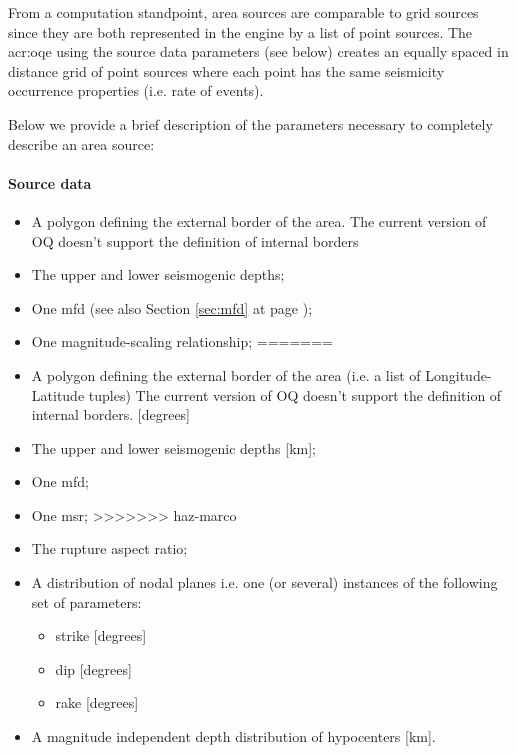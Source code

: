 From a computation standpoint, area sources are comparable to grid sources
since they are both represented in the engine by a list of point sources.
The \gls{acr:oqe} using the source data parameters (see below)  
creates an equally spaced in distance grid of point sources where
each point has the same seismicity occurrence properties (i.e. rate
of events).

Below we provide a brief description of the parameters necessary to 
completely describe an area source:
%
\paragraph{Source data}
\begin{itemize}
<<<<<<< HEAD
\item A polygon defining the external border of the area. 
The current version of OQ doesn't support the definition 
of internal borders
\item The upper and lower seismogenic depths;
\item One \gls{mfd} (see also Section \ref{sec:mfd} at page 
    \pageref{sec:mfd});
\item One magnitude-scaling relationship;
=======
\item A polygon defining the external border of the area (i.e. a list of 
Longitude-Latitude tuples) The current version of OQ doesn't support the 
definition of internal borders.  [degrees]
\item The upper and lower seismogenic depths [km];
\item One \gls{mfd};
\item One \gls{msr};
>>>>>>> haz-marco
\item The rupture aspect ratio;
\item A distribution of nodal planes i.e. one (or several) instances 
    of the following set of parameters:
\begin{itemize}
    \item \gls{strike} [degrees]
    \item \gls{dip} [degrees]
    \item \gls{rake} [degrees]
\end{itemize}
\item A magnitude independent depth distribution of hypocenters [km].
\end{itemize}

